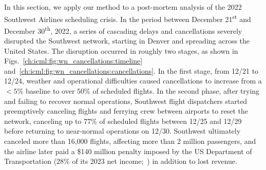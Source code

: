 In this section, we apply our method to a post-mortem analysis of the 2022 Southwest Airlines scheduling crisis. In the period between December 21\textsuperscript{st} and December 30\textsuperscript{th}, 2022, a series of cascading delays and cancellations severely disrupted the Southwest network, starting in Denver and spreading across the United States. The disruption occurred in roughly two stages, as shown in Figs.~\ref{ch:icml:fig:wn_cancellations:timeline} and~\ref{ch:icml:fig:wn_cancellations:cancellations}. In the first stage, from 12/21 to 12/24, weather and operational difficulties caused cancellations to increase from a $< 5\%$ baseline to over $50\%$ of scheduled flights. In the second phase, after trying and failing to recover normal operations, Southwest flight dispatchers started preemptively canceling flights and ferrying crew between airports to reset the network, canceling up to $77\%$ of scheduled flights between 12/25 and 12/29 before returning to near-normal operations on 12/30. Southwest ultimately canceled more than 16,000 flights, affecting more than 2 million passengers, and the airline later paid a \$140 million penalty imposed by the US Department of Transportation ($28\%$ of its 2023 net income;~\cite{roseSouthwestWillPay2023}) in addition to lost revenue.

